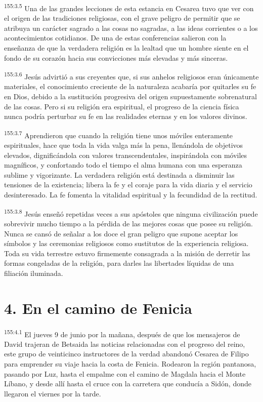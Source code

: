 \par 
\textsuperscript{155:3.5} Una de las grandes lecciones de esta estancia en Cesarea tuvo que ver con el origen de las tradiciones religiosas, con el grave peligro de permitir que se atribuya un carácter sagrado a las cosas no sagradas, a las ideas corrientes o a los acontecimientos cotidianos. De una de estas conferencias salieron con la enseñanza de que la verdadera religión es la lealtad que un hombre siente en el fondo de su corazón hacia sus convicciones más elevadas y más sinceras.

\par 
\textsuperscript{155:3.6} Jesús advirtió a sus creyentes que, si sus anhelos religiosos eran únicamente materiales, el conocimiento creciente de la naturaleza acabaría por quitarles su fe en Dios, debido a la sustitución progresiva del origen supuestamente sobrenatural de las cosas. Pero si su religión era espiritual, el progreso de la ciencia física nunca podría perturbar su fe en las realidades eternas y en los valores divinos.

\par 
\textsuperscript{155:3.7} Aprendieron que cuando la religión tiene unos móviles enteramente espirituales, hace que toda la vida valga más la pena, llenándola de objetivos elevados, dignificándola con valores transcendentales, inspirándola con móviles magníficos, y confortando todo el tiempo el alma humana con una esperanza sublime y vigorizante. La verdadera religión está destinada a disminuir las tensiones de la existencia; libera la fe y el coraje para la vida diaria y el servicio desinteresado. La fe fomenta la vitalidad espiritual y la fecundidad de la rectitud.

\par 
\textsuperscript{155:3.8} Jesús enseñó repetidas veces a sus apóstoles que ninguna civilización puede sobrevivir mucho tiempo a la pérdida de las mejores cosas que posee su religión. Nunca se cansó de señalar a los doce el gran peligro que supone aceptar los símbolos y las ceremonias religiosos como sustitutos de la experiencia religiosa. Toda su vida terrestre estuvo firmemente consagrada a la misión de derretir las formas congeladas de la religión, para darles las libertades líquidas de una filiación iluminada.

\section*{4. En el camino de Fenicia}
\par 
\textsuperscript{155:4.1} El jueves 9 de junio por la mañana, después de que los mensajeros de David trajeran de Betsaida las noticias relacionadas con el progreso del reino, este grupo de veinticinco instructores de la verdad abandonó Cesarea de Filipo para emprender su viaje hacia la costa de Fenicia. Rodearon la región pantanosa, pasando por Luz, hasta el empalme con el camino de Magdala hacia el Monte Líbano, y desde allí hasta el cruce con la carretera que conducía a Sidón, donde llegaron el viernes por la tarde.

